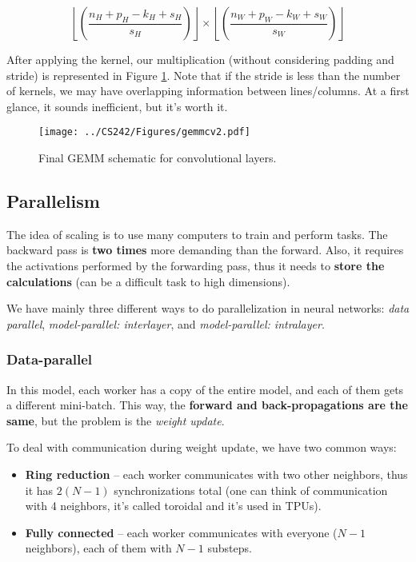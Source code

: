 \documentclass[abstract=true]{scrartcl}
\begin{document}
\begin{equation}
\left \lfloor \left(\frac{n_H + p_H - k_H + s_H}{s_H}\right)\right \rfloor \times \left \lfloor \left(\frac{n_W + p_W - k_W + s_W}{s_W}\right)\right \rfloor    
\label{eq:cnnoperation}
\end{equation}

After applying the kernel, our multiplication (without considering padding and stride) is represented in Figure \ref{fig:gemmcv2}. Note that if the stride is less than the number of kernels, we may have overlapping information between lines/columns.
At a first glance, it sounds inefficient, but it's worth it.
\begin{figure}
    \centering
    \texttt{[image: ../CS242/Figures/gemmcv2.pdf]}
    \caption{Final GEMM schematic for convolutional layers.}
    \label{fig:gemmcv2}
\end{figure}

\subsection{Parallelism}

The idea of scaling is to use many computers to train and perform tasks. The backward pass is \textbf{two times} more demanding than the forward. Also, it requires the activations performed by the forwarding pass, thus it needs to \textbf{store the calculations} (can be a difficult task to high dimensions).

We have mainly three different ways to do parallelization in neural networks: \emph{data parallel}, \emph{model-parallel: interlayer}, and \emph{model-parallel: intralayer}.

\subsubsection{Data-parallel}
In this model, each worker has a copy of the entire model, and each of them gets a different mini-batch. This way, the \textbf{forward and back-propagations are the same}, but the problem is the \emph{weight update}.

To deal with communication during weight update, we have two common ways:

\begin{itemize}
    \item \textbf{Ring reduction} -- each worker communicates with two other neighbors, thus it has $2(N-1)$ synchronizations total (one can think of communication with 4 neighbors, it's called toroidal and it's used in TPUs).
    \item \textbf{Fully connected} -- each worker communicates with everyone ($N-1$ neighbors), each of them with $N-1$ substeps.
\end{itemize}
\end{document}
